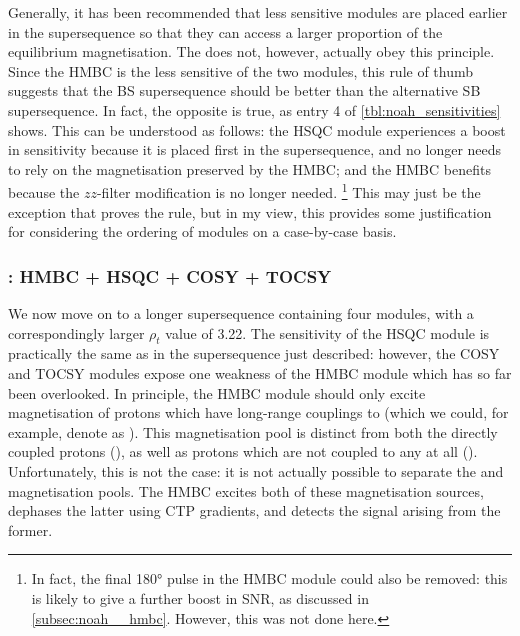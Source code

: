 Generally, it has been recommended that less sensitive modules are placed earlier in the supersequence so that they can access a larger proportion of the equilibrium magnetisation.
The  does not, however, actually obey this principle.
Since the HMBC is the less sensitive of the two modules, this rule of thumb suggests that the BS supersequence should be better than the alternative SB supersequence.
In fact, the opposite is true, as entry 4 of \cref{tbl:noah_sensitivities} shows.
This can be understood as follows: the HSQC module experiences a boost in sensitivity because it is placed first in the supersequence, and no longer needs to rely on the  magnetisation preserved by the HMBC; and the HMBC benefits because the $zz$-filter modification is no longer needed.%
\footnote{In fact, the final \ang{180} pulse in the HMBC module could also be removed: this is likely to give a further boost in SNR, as discussed in \cref{subsec:noah__hmbc}. However, this was not done here.}
This may just be the exception that proves the rule, but in my view, this provides some justification for considering the ordering of modules on a case-by-case basis.

\subsubsection{: HMBC + HSQC + COSY + TOCSY}

We now move on to a longer supersequence containing four modules, with a correspondingly larger $\rho_t$ value of 3.22.
The sensitivity of the HSQC module is practically the same as in the  supersequence just described: however, the COSY and TOCSY modules expose one weakness of the HMBC module which has so far been overlooked.
In principle, the HMBC module should only excite magnetisation of protons which have long-range couplings to \carbon{} (which we could, for example, denote as ).
This magnetisation pool is distinct from both the directly coupled protons (), as well as protons which are not coupled to any \carbon{} at all ().
Unfortunately, this is not the case: it is not actually possible to separate the  and  magnetisation pools.
The HMBC excites both of these magnetisation sources, dephases the latter using CTP gradients, and detects the signal arising from the former.

